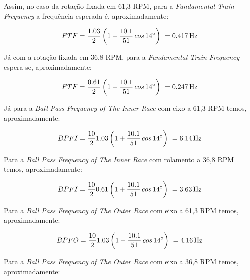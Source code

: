 \documentclass[
	12pt,				
	oneside,			
	a4paper,			
	english,			
	brazil,			
	]{abntex2ppgsi}
\begin{document}
Assim, no caso da rotação fixada em 61,3 RPM, para a \textit{Fundamental Train Frequency} a frequência esperada é, aproximadamente: 

\begin{equation}
	FTF = \frac{1.03}{2} \left ( 1 - \frac{10.1}{51} \,cos \, \ang{14} \right )  \ = \SI{0.417}{{\hertz}}
	\label{eq: FTF no  Rolamento em 100Hz}
\end{equation}

Já com a rotação fixada em 36,8 RPM, para a \textit{Fundamental Train Frequency} espera-se, aproximadamente:

\begin{equation}
	FTF = \frac{0.61}{2} \left ( 1 - \frac{10.1}{51} \,cos \, \ang{14} \right )  \ = \SI{0.247}{{\hertz}}
	\label{eq: FTF no  Rolamento}
\end{equation}



Já para a \textit{Ball Pass Frequency of The Inner Race} com eixo a 61,3 RPM temos, aproximadamente:

\begin{equation}
	BPFI = \frac{10}{2}1.03 \left ( 1 + \frac{10.1}{51} \,cos \, \ang{14} \right )  \ = \SI{6.14}{{\hertz}}
	\label{eq: BPFI no rolamento}
\end{equation}

Para a \textit{Ball Pass Frequency of The Inner Race} com rolamento a 36,8 RPM temos, aproximadamente:

\begin{equation}
	BPFI = \frac{10}{2}0.61 \left ( 1 + \frac{10.1}{51} \,cos \, \ang{14} \right )  \ = \SI{3.63}{{\hertz}}
	\label{eq: BPFI no rolamento}
\end{equation}



Para a \textit{Ball Pass Frequency of The Outer Race} com eixo a 61,3 RPM temos, aproximadamente:

\begin{equation}
	BPFO = \frac{10}{2}1.03 \left ( 1 - \frac{10.1}{51} \,cos \, \ang{14} \right )  \ = \SI{4.16}{{\hertz}}
	\label{eq: BPFO no Rolamento}
\end{equation}

Para a \textit{Ball Pass Frequency of The Outer Race} com eixo a 36,8 RPM temos, aproximadamente:
\end{document}
